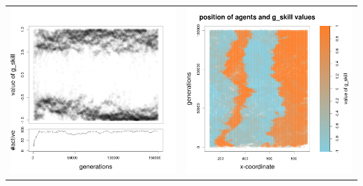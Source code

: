 \documentclass[a4paper,10pt]{article}
\begin{document}
\begin{table}[H]
\begin{tabular}{cc}
 \includegraphics[width=\imgSize]{../images/5StaticEnv/Gplot29_staticEnv1}&\includegraphics[width=\imgSize]{../images/5StaticEnv/Gplot29Static_staticEnv1}\\

\end{tabular}
\end{table}
\end{document}
